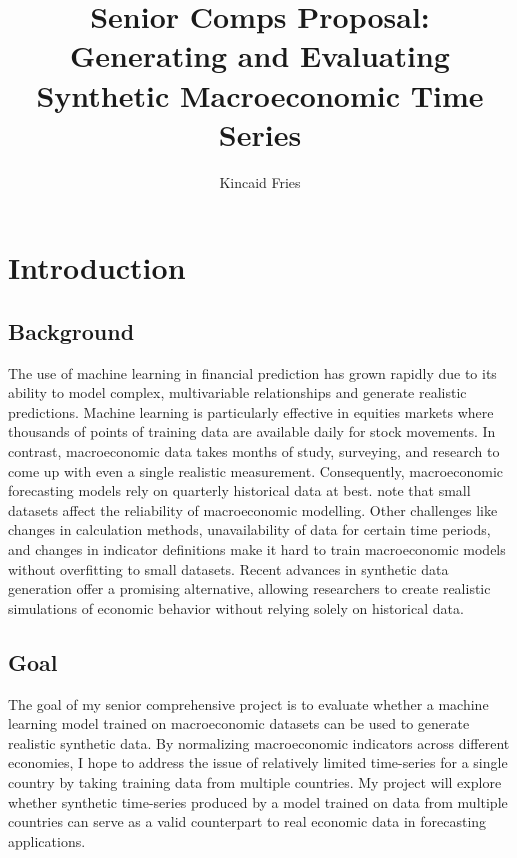 \documentclass[10pt,twocolumn]{article}
\title{Senior Comps Proposal: Generating and Evaluating Synthetic Macroeconomic Time Series}
\author{Kincaid Fries}
\affiliation{Occidental College}
\begin{document}
\maketitle

\section{Introduction}

\subsection{Background}
The use of machine learning in financial prediction has grown rapidly due to its ability to model complex, multivariable relationships and generate realistic predictions. Machine learning is particularly effective in equities markets where thousands of points of training data are available daily for stock movements. In contrast, macroeconomic data takes months of study, surveying, and research to come up with even a single realistic measurement. Consequently, macroeconomic forecasting models rely on quarterly historical data at best. \textcite{baltazar2020sustainableeconomies} note that small datasets affect the reliability of macroeconomic modelling. Other challenges like changes in calculation methods, unavailability of data for certain time periods, and changes in indicator definitions make it hard to train macroeconomic models without overfitting to small datasets. Recent advances in synthetic data generation offer a promising alternative, allowing researchers to create realistic simulations of economic behavior without relying solely on historical data.

\subsection{Goal}
The goal of my senior comprehensive project is to evaluate whether a machine learning model trained on macroeconomic datasets can be used to generate realistic synthetic data. By normalizing macroeconomic indicators across different economies, I hope to address the issue of relatively limited time-series for a single country by taking training data from multiple countries. My project will explore whether synthetic time-series produced by a model trained on data from multiple countries can serve as a valid counterpart to real economic data in forecasting applications.
\end{document}
